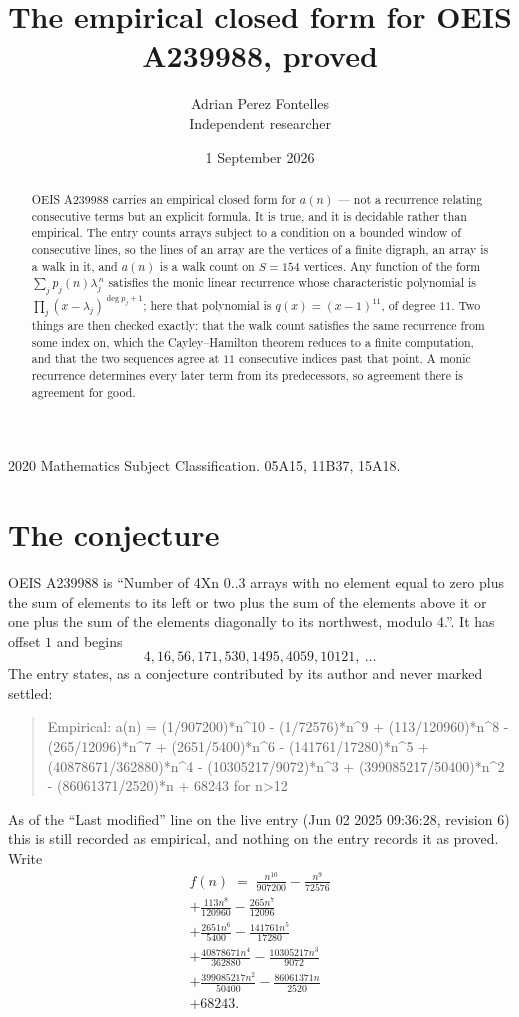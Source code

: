 \documentclass[11pt,a4paper]{article}
\title{The empirical closed form for OEIS A239988, proved}
\author{Adrian Perez Fontelles\\ \small Independent researcher}
\date{1 September 2026}
\theoremstyle{plain}
\theoremstyle{definition}
\begin{document}
\maketitle

\begin{abstract}
OEIS A239988 carries an empirical closed form for $a(n)$ --- not a recurrence relating
consecutive terms but an explicit formula. It is true, and it is decidable rather than
empirical. The entry counts arrays subject to a condition on a bounded window of consecutive lines, so the lines of an array are the
vertices of a finite digraph, an array is a walk in it, and $a(n)$ is a walk count on
$S=154$ vertices. Any function of the form $\sum_j p_j(n)\lambda_j^{\,n}$ satisfies the
monic linear recurrence whose characteristic polynomial is
$\prod_j(x-\lambda_j)^{\deg p_j+1}$; here that polynomial is $q(x)=(x-1)^{11}$, of degree
$11$. Two things are then checked exactly: that the walk count satisfies the same
recurrence from some index on, which the Cayley--Hamilton theorem reduces to a finite
computation, and that the two sequences agree at $11$ consecutive indices past that
point. A monic recurrence determines every later term from its predecessors, so agreement
there is agreement for good.
\end{abstract}

\noindent\small 2020 Mathematics Subject Classification. 05A15, 11B37, 15A18.\normalsize

\section{The conjecture}

OEIS A239988 is ``Number of 4Xn 0..3 arrays with no element equal to zero plus the sum of elements to its left or two plus the sum of the elements above it or one plus the sum of the elements diagonally to its northwest, modulo 4.''. It has offset $1$ and begins
\[
4, 16, 56, 171, 530, 1495, 4059, 10121,\ \dots
\]
The entry states, as a conjecture contributed by its author and never marked settled:
\begin{quote}
Empirical: a(n) = (1/907200)*n\^{}10 - (1/72576)*n\^{}9 + (113/120960)*n\^{}8 - (265/12096)*n\^{}7 + (2651/5400)*n\^{}6 - (141761/17280)*n\^{}5 + (40878671/362880)*n\^{}4 - (10305217/9072)*n\^{}3 + (399085217/50400)*n\^{}2 - (86061371/2520)*n + 68243 for n>12
\end{quote}
As of the ``Last modified'' line on the live entry (Jun 02 2025 09:36:28, revision 6) this is still
recorded as empirical, and nothing on the entry records it as proved. Write
\begin{multline*}
f(n)\;=\;\frac{n^{10}}{907200} - \frac{n^{9}}{72576} \\
+ \frac{113 n^{8}}{120960} - \frac{265 n^{7}}{12096} \\
+ \frac{2651 n^{6}}{5400} - \frac{141761 n^{5}}{17280} \\
+ \frac{40878671 n^{4}}{362880} - \frac{10305217 n^{3}}{9072} \\
+ \frac{399085217 n^{2}}{50400} - \frac{86061371 n}{2520} \\
+ 68243.
\end{multline*}
\end{document}
